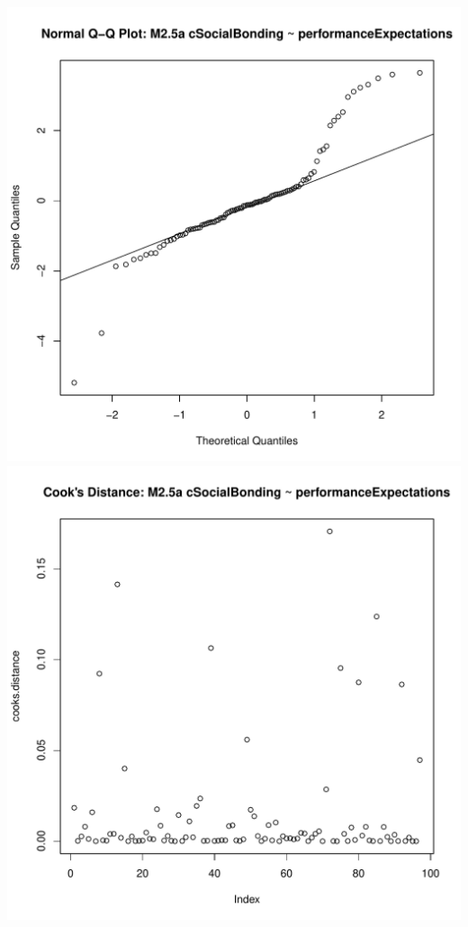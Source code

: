 \documentclass[12pt]{report}
\begin{document}
\includegraphics[scale =.4]{../images/MLM25aQQNorm.pdf}
\includegraphics[scale =.4]{../images/MLM25aCooksD.pdf}
\end{document}
